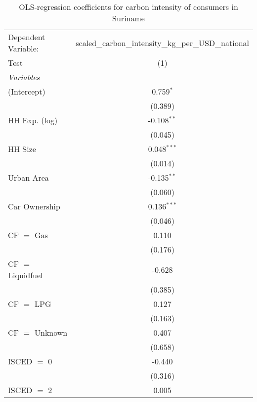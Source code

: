 
\begin{table}[htbp!]
   \centering
   \small
   \begin{adjustbox}{width = 1\textwidth, max height = 0.95\textheight, center}
      \begin{threeparttable}[b]
         \caption{\label{tab:OLS_1_SUR} OLS-regression coefficients for carbon intensity of consumers in Suriname}
         \begin{tabular}{lc}
            \tabularnewline \midrule \midrule
            Dependent Variable: & scaled\_carbon\_intensity\_kg\_per\_USD\_national\\        
            Test                & (1)\\  
            \midrule
            \emph{Variables}\\
            (Intercept)         & 0.759$^{*}$\\   
                                & (0.389)\\   
            HH Exp. (log)       & -0.108$^{**}$\\   
                                & (0.045)\\   
            HH Size             & 0.048$^{***}$\\   
                                & (0.014)\\   
            Urban Area          & -0.135$^{**}$\\   
                                & (0.060)\\   
            Car Ownership       & 0.136$^{***}$\\   
                                & (0.046)\\   
            CF $=$ Gas          & 0.110\\   
                                & (0.176)\\   
            CF $=$ Liquidfuel   & -0.628\\   
                                & (0.385)\\   
            CF $=$ LPG          & 0.127\\   
                                & (0.163)\\   
            CF $=$ Unknown      & 0.407\\   
                                & (0.658)\\   
            ISCED $=$ 0         & -0.440\\   
                                & (0.316)\\   
            ISCED $=$ 2         & 0.005\\   

\end{tabular}
\end{threeparttable}
\end{adjustbox}
\end{table}
